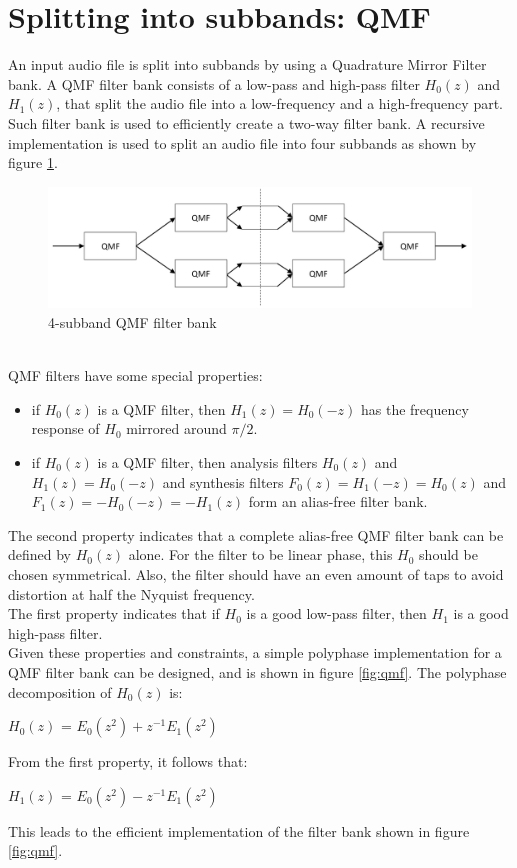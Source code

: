 \documentclass[a4paper]{article}
\begin{document}
\section{Splitting into subbands: QMF}
An input audio file is split into subbands by using a Quadrature Mirror Filter bank.
A QMF filter bank consists of a low-pass and high-pass filter $H_0(z)$ and $H_1(z)$, that split the audio file into a low-frequency and a high-frequency part. Such filter bank is used to efficiently create a two-way filter bank. A recursive implementation is used to split an audio file into four subbands as shown by figure \ref{fig:qmfrecursive}.\\
\begin{figure}[hbt]
\includegraphics[width = \textwidth]{qmfrecursive}
\caption{4-subband QMF filter bank}
\label{fig:qmfrecursive}
\end{figure} \\
QMF filters have some special properties:
\begin{itemize}
\item if $H_0(z)$ is a QMF filter, then $H_1(z) = H_0(-z)$ has the frequency response of $H_0$ mirrored around $\pi/2$.
\item if $H_0(z)$ is a QMF filter, then analysis filters $H_0(z)$ and $H_1(z) = H_0(-z)$ and synthesis filters $F_0(z)=H_1(-z)=H_0(z)$ and $F_1(z)=-H_0(-z) = -H_1(z)$ form an alias-free filter bank.
\end{itemize}

The second property indicates that a complete alias-free QMF filter bank can be defined by $H_0(z)$ alone. For the filter to be linear phase, this $H_0$ should be chosen symmetrical. Also, the filter should have an even amount of taps to avoid distortion at half the Nyquist frequency. \\

The first property indicates that if $H_0$ is a good low-pass filter, then $H_1$ is a good high-pass filter. \\

Given these properties and constraints, a simple polyphase implementation for a QMF filter bank can be designed, and is shown in figure \ref{fig:qmf}. The polyphase decomposition of $H_0(z)$ is:\\
\begin{center}
$H_0(z)$ = $E_0(z^2) + z^{-1} E_1(z^2)$ \\
\end{center}
From the first property, it follows that: \\
\begin{center}
$H_1(z)$ = $E_0(z^2) - z^{-1} E_1(z^2)$ \\
\end{center}
This leads to the efficient implementation of the filter bank shown in figure \ref{fig:qmf}.
\end{document}
